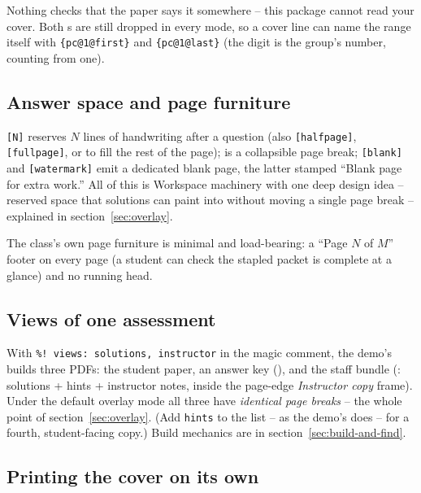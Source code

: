 \begin{manexsource}
\begin{problemchoice}[select=5, points=6, instruction=none]
\end{manexsource}

\noindent
Nothing checks that the paper says it somewhere -- this package cannot read
your cover. Both s are still dropped in every mode, so a cover line
can name the range itself with \texttt{\{pc@1@first\}} and
\texttt{\{pc@1@last\}} (the digit is the group's number, counting
from one).

\subsection{Answer space and page furniture}

\texttt{[N]} reserves $N$ lines of handwriting after a question
(also \texttt{[halfpage]}, \texttt{[fullpage]}, or  to fill
the rest of the page);  is a collapsible page break;
\texttt{[blank]} and \texttt{[watermark]} emit a dedicated
blank page, the latter stamped ``Blank page for extra work.'' All of this is
Workspace machinery with one deep design idea -- reserved space that
solutions can paint into without moving a single page break -- explained in
section~\ref{sec:overlay}.

The class's own page furniture is minimal and load-bearing: a ``Page $N$ of
$M$'' footer on every page (a student can check the stapled packet is
complete at a glance) and no running head.

\subsection{Views of one assessment}

With \texttt{\%! views: solutions, instructor} in the magic comment, the
demo's  builds three PDFs: the student paper, an answer key
(), and the staff bundle (: solutions +
hints + instructor notes, inside the page-edge \emph{Instructor copy} frame).
Under the default overlay mode all three have \emph{identical page breaks} --
the whole point of section~\ref{sec:overlay}. (Add \texttt{hints} to the list
-- as the demo's  does -- for a fourth, student-facing
 copy.) Build mechanics are in section~\ref{sec:build-and-find}.

\subsection{Printing the cover on its own}

